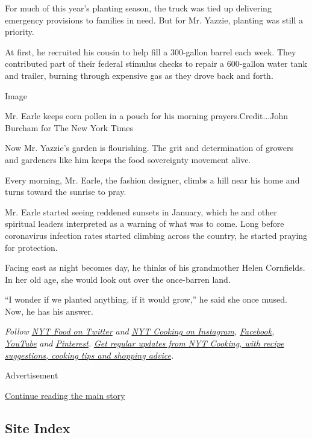 For much of this year's planting season, the truck was tied up
delivering emergency provisions to families in need. But for Mr. Yazzie,
planting was still a priority.

At first, he recruited his cousin to help fill a 300-gallon barrel each
week. They contributed part of their federal stimulus checks to repair a
600-gallon water tank and trailer, burning through expensive gas as they
drove back and forth.

Image

Mr. Earle keeps corn pollen in a pouch for his morning
prayers.Credit...John Burcham for The New York Times

Now Mr. Yazzie's garden is flourishing. The grit and determination of
growers and gardeners like him keeps the food sovereignty movement
alive.

Every morning, Mr. Earle, the fashion designer, climbs a hill near his
home and turns toward the sunrise to pray.

Mr. Earle started seeing reddened sunsets in January, which he and other
spiritual leaders interpreted as a warning of what was to come. Long
before coronavirus infection rates started climbing across the country,
he started praying for protection.

Facing east as night becomes day, he thinks of his grandmother Helen
Cornfields. In her old age, she would look out over the once-barren
land.

``I wonder if we planted anything, if it would grow,'' he said she once
mused. Now, he has his answer.

\emph{Follow} \href{https://twitter.com/nytfood}{\emph{NYT Food on
Twitter}} \emph{and}
\href{https://www.instagram.com/nytcooking/}{\emph{NYT Cooking on
Instagram}}\emph{,}
\href{https://www.facebookcorewwwi.onion/nytcooking/}{\emph{Facebook}}\emph{,}
\href{https://www.youtube.com/nytcooking}{\emph{YouTube}} \emph{and}
\href{https://www.pinterest.com/nytcooking/}{\emph{Pinterest}}\emph{.}
\href{https://www.nytimes3xbfgragh.onion/newsletters/cooking}{\emph{Get
regular updates from NYT Cooking, with recipe suggestions, cooking tips
and shopping advice}}\emph{.}

Advertisement

\protect\hyperlink{after-bottom}{Continue reading the main story}

\hypertarget{site-index}{%
\subsection{Site Index}\label{site-index}}

